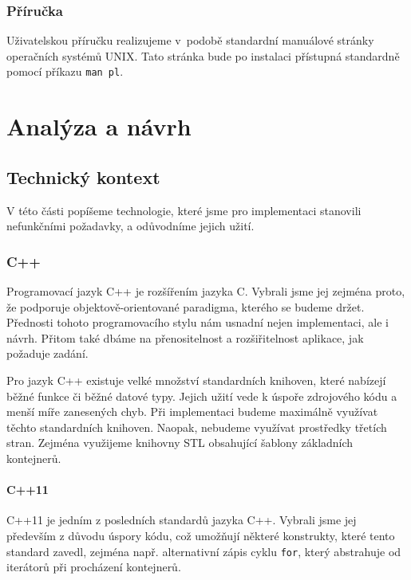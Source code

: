 \documentclass[thesis=B,czech,hidelinks]{thesis}[2012/06/26]
\begin{document}
\subsection{Příručka}

Uživatelskou příručku realizujeme v~podobě standardní manuálové stránky operačních systémů UNIX. Tato stránka bude po instalaci přístupná standardně pomocí příkazu \texttt{man pl}.

%
%
%

\chapter{Analýza a návrh}

\section{Technický kontext}

V této části popíšeme technologie, které jsme pro implementaci stanovili nefunkčními požadavky, a odůvodníme jejich užití.

\subsection{C++}

Programovací jazyk C++ je rozšířením jazyka C. Vybrali jsme jej zejména proto, že podporuje objektově-orientované paradigma, kterého se budeme držet. Přednosti tohoto programovacího stylu nám usnadní nejen implementaci, ale i návrh. Přitom také dbáme na přenositelnost a rozšiřitelnost aplikace, jak požaduje zadání.

Pro jazyk C++ existuje velké množství standardních knihoven, které nabízejí běžné funkce či běžné datové typy. Jejich užití vede k úspoře zdrojového kódu a menší míře zanesených chyb. Při implementaci budeme maximálně využívat těchto standardních knihoven. Naopak, nebudeme využívat prostředky třetích stran. Zejména využijeme knihovny STL obsahující šablony základních kontejnerů.

\subsubsection{C++11}

C++11 je jedním z posledních standardů jazyka C++. Vybrali jsme jej především z důvodu úspory kódu, což umožňují některé konstrukty, které tento standard zavedl, zejména např. alternativní zápis cyklu \texttt{for}, který abstrahuje od iterátorů při procházení kontejnerů\cite{cpp}.
\end{document}
